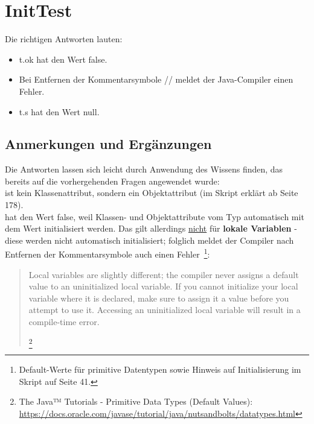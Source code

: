 \chapter{InitTest}

Die richtigen Antworten lauten:

\begin{itemize}
    \item t.ok hat den Wert false.
    \item Bei Entfernen der Kommentarsymbole // meldet der Java-Compiler einen Fehler.
    \item t.s hat den Wert null.
\end{itemize}


\section*{Anmerkungen und Ergänzungen}

Die Antworten lassen sich leicht durch Anwendung des Wissens finden, das bereits auf die vorhergehenden Fragen angewendet wurde:\\

 ist kein Klassenattribut, sondern ein Objektattribut (im Skript erklärt ab Seite 178).\\

 hat den Wert false, weil Klassen- und Objektattribute vom Typ  automatisch mit dem Wert  initialisiert
werden.
Das gilt allerdings \underline{nicht} für \textbf{lokale Variablen} - diese werden nicht automatisch initialisiert; folglich meldet der Compiler
nach Entfernen der Kommentarsymbole auch einen Fehler~\footnote{
    Default-Werte für primitive Datentypen sowie Hinweis auf Initialisierung im Skript auf Seite 41.
}:

\blockquote[\footnote{
The Java™ Tutorials - Primitive Data Types (Default Values): \url{https://docs.oracle.com/javase/tutorial/java/nutsandbolts/datatypes.html}
}]{
    Local variables are slightly different; the compiler never assigns a default value to an uninitialized local variable.
    If you cannot initialize your local variable where it is declared, make sure to assign it a value before you attempt to use it.
    Accessing an uninitialized local variable will result in a compile-time error.

}



